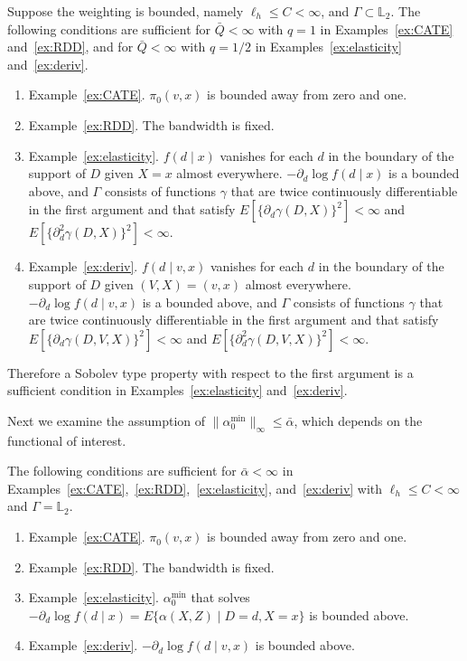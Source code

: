 \begin{lemma}\label{lemma:cont}
Suppose the weighting is bounded,  namely $\ell_h \leq C<\infty$, and $\Gamma\subset \mathbb{L}_2$. The following conditions are sufficient for $\bar{Q}<\infty$ with $q=1$ in Examples~\ref{ex:CATE} and~\ref{ex:RDD}, and for $\bar{Q}<\infty$ with $q=1/2$ in Examples~\ref{ex:elasticity} and~\ref{ex:deriv}.
\begin{enumerate}
    \item Example~\ref{ex:CATE}. $\pi_0(v,x)$ is bounded away from zero and one.
    \item Example~\ref{ex:RDD}. The bandwidth is fixed.
    \item Example~\ref{ex:elasticity}. $f(d\mid x)$ vanishes for each $d$ in the boundary of the support of $D$ given $X=x$ almost everywhere. $-\partial_d \log f(d \mid x)$ is a bounded above, and $\Gamma$ consists of functions
    $\gamma$ that are twice continuously differentiable in the first argument and that satisfy $E[ \{\partial_d \gamma(D,X)\}^2]<\infty$ and $E[ \{\partial^2_d \gamma(D,X)\}^2]<\infty$.
     \item Example~\ref{ex:deriv}. $f(d\mid v,x)$ vanishes for each $d$ in the boundary of the support of $D$ given $(V,X)=(v,x)$ almost everywhere. $-\partial_d \log f(d \mid v,x)$ is a bounded above, and $\Gamma$ consists of functions
    $\gamma$ that are twice continuously differentiable in the first argument and that satisfy $E[ \{\partial_d \gamma(D,V,X)\}^2]<\infty$ and $E[ \{\partial^2_d \gamma(D,V,X)\}^2]<\infty$.
\end{enumerate}
\end{lemma}
Therefore a Sobolev type property with respect to the first argument is a sufficient condition in Examples~\ref{ex:elasticity} and~\ref{ex:deriv}.

Next we examine the assumption of $\|\alpha^{\min}_0\|_{\infty} \leq \bar{\alpha}$, which depends on the functional of interest.
\begin{lemma}\label{lemma:bounded_RR_global}
The following conditions are sufficient for $\bar{\alpha}<\infty$ in Examples~\ref{ex:CATE},~\ref{ex:RDD},~\ref{ex:elasticity}, and~\ref{ex:deriv} with $\ell_h \leq C<\infty$ and $\Gamma=\mathbb{L}_2$.
\begin{enumerate}
    \item Example~\ref{ex:CATE}. $\pi_0(v,x)$ is bounded away from zero and one.
    \item Example~\ref{ex:RDD}. The bandwidth is fixed.
    \item Example~\ref{ex:elasticity}. $\alpha_0^{\min}$ that solves
    $
    -\partial_d \log f(d \mid x)=E\{\alpha(X,Z) \mid D=d,X=x\}
    $ is bounded above.
    \item Example~\ref{ex:deriv}. $
    -\partial_d \log f(d \mid v,x)
    $ is bounded above.
\end{enumerate}
\end{lemma}

